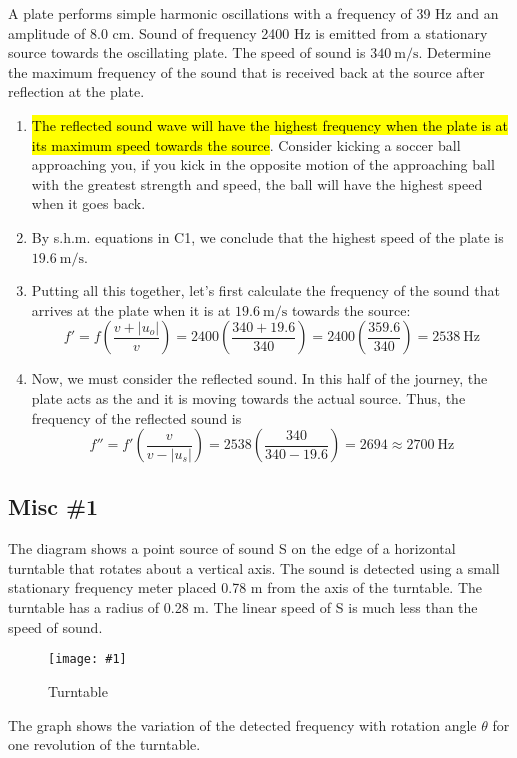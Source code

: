 \documentclass[a4paper,12pt]{article}
\newcommand{\img}[4]{\begin{center}
  \begin{figure}[H]
    \centering
    \texttt{[image: \#1]}
    \caption{#3}
    \label{fig:#4}
  \end{figure}
\end{center}}
\newcommand{\paren}[1]{\left(#1\right)}
\begin{document}
A plate performs simple harmonic oscillations with a frequency of 39 Hz and an amplitude of 8.0 cm. Sound of frequency 2400 Hz is emitted from a stationary source towards the oscillating plate. The speed of sound is $\SI{340}{\meter\per\second}$. Determine the maximum frequency of the sound that is received back at the source after reflection at the plate.
\begin{enumerate}
  \item \hl{The reflected sound wave will have the highest frequency when the plate is at its maximum speed towards the source}. Consider kicking a soccer ball approaching you, if you kick in the opposite motion of the approaching ball with the greatest strength and speed, the ball will have the highest speed when it goes back.
  \item By s.h.m. equations in C1, we conclude that the highest speed of the plate is $\SI{19.6}{\meter\per\second}$.
  \item Putting all this together, let's first calculate the frequency of the sound that arrives at the plate when it is at $\SI{19.6}{\meter\per\second}$ towards the source:
        $$f' = f\paren{\frac{v + |u_o|}{v}} = 2400\paren{\frac{340 + 19.6}{340}} = 2400\paren{\frac{359.6}{340}} = 2538\mathrm{~Hz}$$
  \item Now, we must consider the reflected sound. In this half of the journey, the plate acts as the  and it is moving towards the actual source. Thus, the frequency of the reflected sound is
        $$f'' = f'\paren{\frac{v}{v - |u_s|}} = 2538\paren{\frac{340}{340 - 19.6}} = 2694 \approx 2700 \mathrm{~Hz}$$
\end{enumerate}

\pagebreak

\subsection{Misc \#1}

The diagram shows a point source of sound S on the edge of a horizontal turntable that rotates about a vertical axis. The sound is detected using a small stationary frequency meter placed 0.78 m from the axis of the turntable. The turntable has a radius of 0.28 m. The linear speed of S is much less than the speed of sound.

\img{ex/1.png}{0.9}{Turntable}{1}

The graph shows the variation of the detected frequency with rotation angle $\theta$ for one revolution of the turntable.
\end{document}
